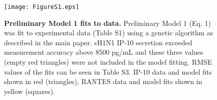 \documentclass[10pt]{article}
\begin{document}
\setcounter{figure}{0}
\renewcommand{\thefigure}{S\arabic{figure}}

\begin{figure}[b]
\begin{center}
\texttt{[image: FigureS1.eps]}
\caption{{\bf Preliminary Model 1 fits to data.}  Preliminary Model 1 (Eq. 1) was fit to experimental data (Table S1) using a genetic algorithm as described in the main paper.  sH1N1 IP-10 secretion exceeded measurement accuracy above 8500 pg/mL and these three values (empty red triangles) were not included in the model fitting.  RMSE values of the fits can be seen in Table S3.  IP-10 data and model fits shown in red (triangles), RANTES data and model fits shown in yellow (squares).}
\label{fig:fits}
\end{center}
\end{figure}
\end{document}
